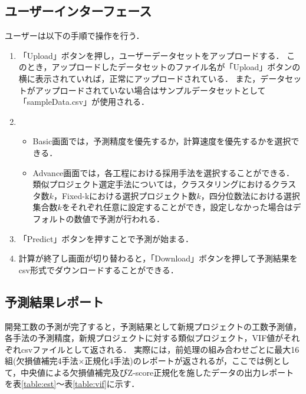 \subsection{ユーザーインターフェース}
ユーザーは以下の手順で操作を行う．
\begin{enumerate}
  \item 「Upload」ボタンを押し，ユーザーデータセットをアップロードする．
  このとき，アップロードしたデータセットのファイル名が「Upload」ボタンの横に表示されていれば，正常にアップロードされている．
  また，データセットがアップロードされていない場合はサンプルデータセットとして「sampleData.csv」が使用される．
  \item \begin{itemize}
    \item Basic画面では，予測精度を優先するか，計算速度を優先するかを選択できる．
    \item Advance画面では，各工程における採用手法を選択することができる．類似プロジェクト選定手法については，クラスタリングにおけるクラスタ数$k$，Fixed-kにおける選択プロジェクト数$k$，四分位数法における選択集合数$k$をそれぞれ任意に設定することができ，設定しなかった場合はデフォルトの数値で予測が行われる．
    \end{itemize}
  \item 「Predict」ボタンを押すことで予測が始まる．
  \item 計算が終了し画面が切り替わると，「Download」ボタンを押して予測結果をcsv形式でダウンロードすることができる．


\end{enumerate}

\subsection{予測結果レポート}
開発工数の予測が完了すると，予測結果として新規プロジェクトの工数予測値，各手法の予測精度，新規プロジェクトに対する類似プロジェクト，VIF値がそれぞれcsvファイルとして返される．
実際には，前処理の組み合わせごとに最大16組(欠損値補完4手法$\times$正規化4手法)のレポートが返されるが，ここでは例として，中央値による欠損値補完及びZ-score正規化を施したデータの出力レポートを表\ref{table:est}～表\ref{table:vif}に示す．






